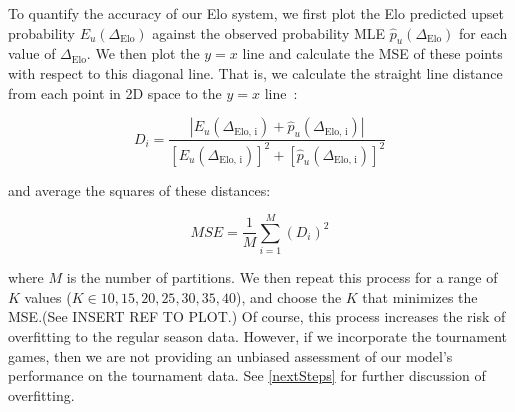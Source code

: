 \documentclass{article}
\begin{document}
To quantify the accuracy of our Elo system, we first plot the Elo predicted upset probability $E_u(\Delta_{\text{Elo}})$ against the observed probability MLE $\hat{p}_u(\Delta_{\text{Elo}})$ for each value of $\Delta_{\text{Elo}}$. We then plot the $y=x$ line and calculate the MSE of these points with respect to this diagonal line. That is, we calculate the straight line distance from each point in 2D space to the $y=x$ line~\cite{enwiki:1235411332}:

\[
D_i = \frac{|E_u(\Delta_{\text{Elo, i}}) + \hat{p}_u(\Delta_{\text{Elo, i}})|}{{[E_u(\Delta_{\text{Elo, i}})]}^2+{[\hat{p}_u(\Delta_{\text{Elo, i}})]}^2}
\]

and average the squares of these distances:

\[
MSE = \frac{1}{M}\sum_{i=1}^M {(D_i)}^2
\]

where $M$ is the number of partitions. We then repeat this process for a range of $K$ values ($K \in {10, 15, 20, 25, 30, 35, 40}$), and choose the $K$ that minimizes the MSE.\@ (See INSERT REF TO PLOT.) Of course, this process increases the risk of overfitting to the regular season data. However, if we incorporate the tournament games, then we are not providing an unbiased assessment of our model's performance on the tournament data. See \autoref{nextSteps} for further discussion of overfitting.
\end{document}
